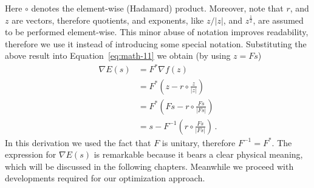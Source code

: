 Here $\circ$ denotes the element-wise (Hadamard) product. Moreover,
note that $r$, and $z$ are vectors, therefore quotients, and
exponents, like $z/|z|$, and $z^{\frac{1}{2}}$, are assumed to be
performed element-wise. This minor abuse of notation improves
readability, therefore we use it instead of introducing some special
notation. Substituting the above result into
Equation~\eqref{eq:math-11} we obtain (by using $z=Fs$)
\begin{equation}
  \label{eq:68}
  \begin{split}
    \nabla E(s)
    & = F^{*}\nabla f(z)\\
    & = F^{*} \left(
      z - r\circ \frac{z}{|z|}
    \right) \\
    & = F^{*} \left(
      Fs - r\circ \frac{Fs}{|Fs|}
    \right) \\
    & = s - F^{-1}
    \left(
      r\circ \frac{Fs}{|Fs|}
    \right)\,. 
  \end{split}
\end{equation}
In this derivation we used the fact that $F$ is unitary,
therefore $F^{-1} = F^{*}$. The expression for $\nabla E(s)$
is remarkable because it bears a clear physical meaning, which will be
discussed in the following chapters. Meanwhile we proceed
with developments required for our optimization approach.

